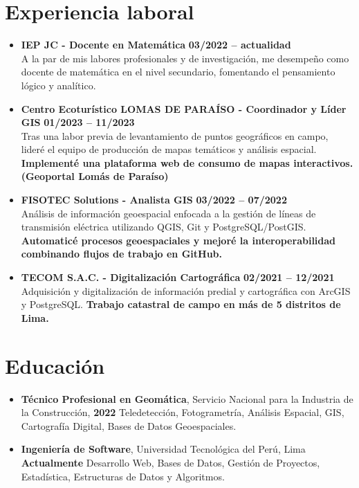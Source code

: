 \documentclass[11pt,a4paper]{article}
\begin{document}
\section*{Experiencia laboral}
\begin{itemize}[left=15pt]
  \item \textbf{IEP JC - Docente en Matemática} \hfill \textbf{03/2022 -- actualidad}\\
    A la par de mis labores profesionales y de investigación, me desempeño como docente de matemática en el nivel secundario, fomentando el pensamiento lógico y analítico.
  \item \textbf{Centro Ecoturístico LOMAS DE PARAÍSO - Coordinador y Líder GIS} \hfill \textbf{01/2023 -- 11/2023}\\
    Tras una labor previa de levantamiento de puntos geográficos en campo, lideré el equipo de producción de mapas temáticos y análisis espacial. \textbf{Implementé una plataforma web de consumo de mapas interactivos. (Geoportal Lomás de Paraíso)}
  \item \textbf{FISOTEC Solutions - Analista GIS} \hfill \textbf{03/2022 -- 07/2022}\\
    Análisis de información geoespacial enfocada a la gestión de líneas de transmisión eléctrica utilizando QGIS, Git y PostgreSQL/PostGIS. \textbf{Automaticé procesos geoespaciales y mejoré la interoperabilidad combinando flujos de trabajo en GitHub.}
  \item \textbf{TECOM S.A.C. - Digitalización Cartográfica} \hfill \textbf{02/2021 -- 12/2021}\\
    Adquisición y digitalización de información predial y cartográfica con ArcGIS y PostgreSQL. \textbf{Trabajo catastral de campo en más de 5 distritos de Lima.}
\end{itemize}
\vspace{-0.5cm}
\section*{Educación}
\begin{itemize}[left=15pt]
  \item \textbf{Técnico Profesional en Geomática}, Servicio Nacional para la Industria de la Construcción, \hfill \textbf{2022}
  \vspace{-0.3cm}
  \subitem Teledetección, Fotogrametría, Análisis Espacial, GIS, Cartografía Digital, Bases de Datos Geoespaciales.
  \item \textbf{Ingeniería de Software}, Universidad Tecnológica del Perú, Lima \hfill \textbf{Actualmente}
  \vspace{-0.3cm}
  \subitem Desarrollo Web, Bases de Datos, Gestión de Proyectos, Estadística, Estructuras de Datos y Algoritmos.
\end{itemize}
\vspace{-0.2cm}
\end{document}
